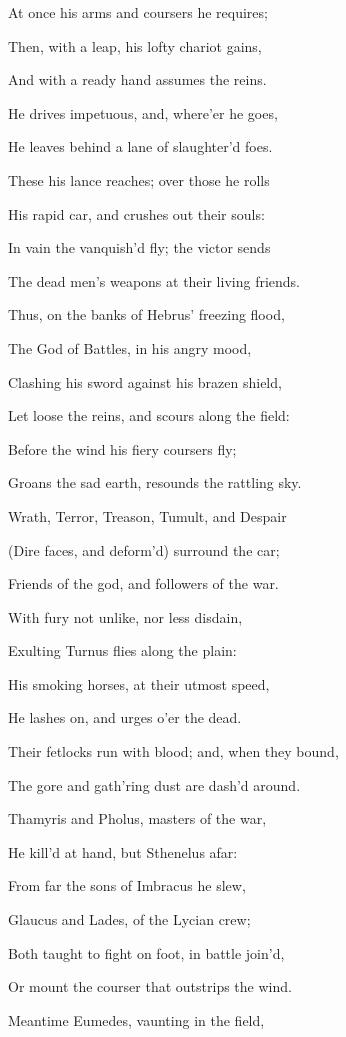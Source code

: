 At once his arms and coursers he requires;

Then, with a leap, his lofty chariot gains,

And with a ready hand assumes the reins.

He drives impetuous, and, where’er he goes,

He leaves behind a lane of slaughter’d foes.

These his lance reaches; over those he rolls

His rapid car, and crushes out their souls:

In vain the vanquish’d fly; the victor sends

The dead men’s weapons at their living friends.

Thus, on the banks of Hebrus’ freezing flood,

The God of Battles, in his angry mood,

Clashing his sword against his brazen shield,

Let loose the reins, and scours along the field:

Before the wind his fiery coursers fly;

Groans the sad earth, resounds the rattling sky.

Wrath, Terror, Treason, Tumult, and Despair

(Dire faces, and deform’d) surround the car;

Friends of the god, and followers of the war.

With fury not unlike, nor less disdain,

Exulting Turnus flies along the plain:

His smoking horses, at their utmost speed,

He lashes on, and urges o’er the dead.

Their fetlocks run with blood; and, when they bound,

The gore and gath’ring dust are dash’d around.

Thamyris and Pholus, masters of the war,

He kill’d at hand, but Sthenelus afar:

From far the sons of Imbracus he slew,

Glaucus and Lades, of the Lycian crew;

Both taught to fight on foot, in battle join’d,

Or mount the courser that outstrips the wind.

Meantime Eumedes, vaunting in the field,


